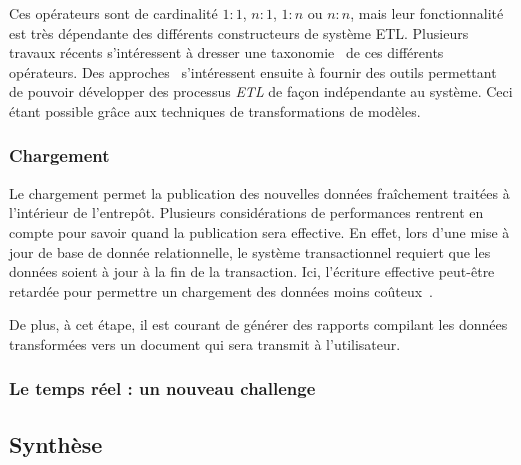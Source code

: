 
Ces opérateurs sont de cardinalité $1\!\!:\!\!1$, $n\!\!:\!\!1$, $1\!\!:\!\!n$ ou $n\!\!:\!\!n$, mais leur fonctionnalité est très dépendante des différents constructeurs de système ETL. Plusieurs travaux récents s'intéressent à dresser une taxonomie~\cite{Vassiliadis:taxonomy} de ces différents opérateurs. Des approches~\cite{Akkaoui:etl,Trujilo:uml-etl} s'intéressent ensuite à fournir des outils permettant de pouvoir développer des processus \textit{ETL} de façon indépendante au système. Ceci étant possible grâce aux techniques de transformations de modèles.

\subsubsection{Chargement}
Le chargement permet la publication des nouvelles données fraîchement traitées à l'intérieur de l'entrepôt. Plusieurs considérations de performances rentrent en compte pour savoir quand la publication sera effective. En effet, lors d'une mise à jour de base de donnée relationnelle, le système transactionnel requiert que les données soient à jour à la fin de la transaction. Ici, l'écriture effective peut-être retardée pour permettre un chargement des données moins coûteux~\cite{Petit:historical}.

De plus, à cet étape, il est courant de générer des rapports compilant les données transformées vers un document qui sera transmit à l'utilisateur.

\subsubsection{Le temps réel : un nouveau challenge}
\subsection{Synthèse}